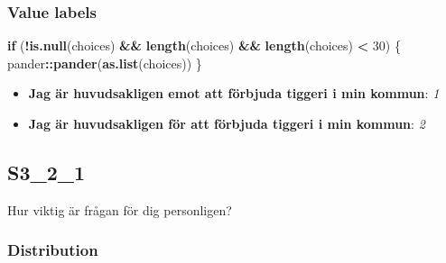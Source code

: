 \documentclass[]{book}
\newenvironment{Shaded}{\begin{snugshade}}{\end{snugshade}}
\newcommand{\KeywordTok}[1]{\textcolor[rgb]{0.13,0.29,0.53}{\textbf{#1}}}
\newcommand{\DecValTok}[1]{\textcolor[rgb]{0.00,0.00,0.81}{#1}}
\newcommand{\StringTok}[1]{\textcolor[rgb]{0.31,0.60,0.02}{#1}}
\newcommand{\ControlFlowTok}[1]{\textcolor[rgb]{0.13,0.29,0.53}{\textbf{#1}}}
\newcommand{\OperatorTok}[1]{\textcolor[rgb]{0.81,0.36,0.00}{\textbf{#1}}}
\newcommand{\NormalTok}[1]{#1}
\providecommand{\tightlist}{%
  \setlength{\itemsep}{0pt}\setlength{\parskip}{0pt}}
\begin{document}
\subsubsection{Value labels}\label{S3_1_1_labels}

\begin{Shaded}
\begin{Highlighting}[]
\ControlFlowTok{if}\NormalTok{ (}\OperatorTok{!}\KeywordTok{is.null}\NormalTok{(choices) }\OperatorTok{&&}\StringTok{ }\KeywordTok{length}\NormalTok{(choices) }\OperatorTok{&&}\StringTok{ }\KeywordTok{length}\NormalTok{(choices) }\OperatorTok{<}\StringTok{ }\DecValTok{30}\NormalTok{) \{}
\NormalTok{    pander}\OperatorTok{::}\KeywordTok{pander}\NormalTok{(}\KeywordTok{as.list}\NormalTok{(choices))}
\NormalTok{\}}
\end{Highlighting}
\end{Shaded}

\begin{itemize}
\tightlist
\item
  \textbf{Jag är huvudsakligen emot att förbjuda tiggeri i min kommun}:
  \emph{1}
\item
  \textbf{Jag är huvudsakligen för att förbjuda tiggeri i min kommun}:
  \emph{2}
\end{itemize}

\subsection{S3\_2\_1}\label{S3_2_1}

Hur viktig är frågan för dig personligen?

\subsubsection{Distribution}\label{S3_2_1_distribution}
\end{document}
